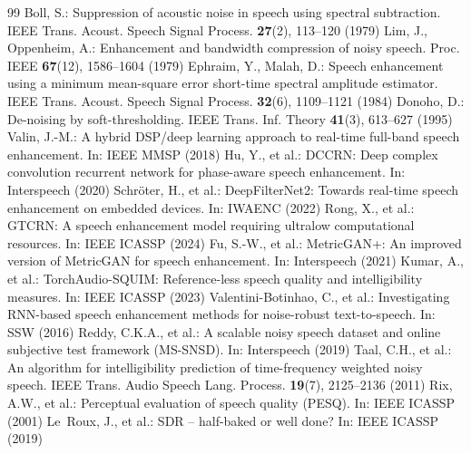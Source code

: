 \documentclass[runningheads]{llncs}
\begin{document}
\begin{thebibliography}{99}
 Boll, S.: Suppression of acoustic noise in speech using spectral
subtraction. IEEE Trans. Acoust. Speech Signal Process. \textbf{27}(2),
113--120 (1979)
 Lim, J., Oppenheim, A.: Enhancement and bandwidth compression of
noisy speech. Proc. IEEE \textbf{67}(12), 1586--1604 (1979)
 Ephraim, Y., Malah, D.: Speech enhancement using a
minimum mean-square error short-time spectral amplitude estimator. IEEE Trans.
Acoust. Speech Signal Process. \textbf{32}(6), 1109--1121 (1984)
 Donoho, D.: De-noising by soft-thresholding. IEEE Trans. Inf.
Theory \textbf{41}(3), 613--627 (1995)
 Valin, J.-M.: A hybrid DSP/deep learning approach to real-time
full-band speech enhancement. In: IEEE MMSP (2018)
 Hu, Y., et al.: DCCRN: Deep complex convolution recurrent
network for phase-aware speech enhancement. In: Interspeech (2020)
 Schr\"oter, H., et al.: DeepFilterNet2: Towards
real-time speech enhancement on embedded devices. In: IWAENC (2022)
 Rong, X., et al.: GTCRN: A speech enhancement model requiring
ultralow computational resources. In: IEEE ICASSP (2024)
 Fu, S.-W., et al.: MetricGAN+: An improved version of
MetricGAN for speech enhancement. In: Interspeech (2021)
 Kumar, A., et al.: TorchAudio-SQUIM: Reference-less speech
quality and intelligibility measures. In: IEEE ICASSP (2023)
 Valentini-Botinhao, C., et al.: Investigating RNN-based
speech enhancement methods for noise-robust text-to-speech. In: SSW (2016)
 Reddy, C.K.A., et al.: A scalable noisy speech dataset and
online subjective test framework (MS-SNSD). In: Interspeech (2019)
 Taal, C.H., et al.: An algorithm for intelligibility prediction
of time-frequency weighted noisy speech. IEEE Trans. Audio Speech Lang. Process.
\textbf{19}(7), 2125--2136 (2011)
 Rix, A.W., et al.: Perceptual evaluation of speech quality
(PESQ). In: IEEE ICASSP (2001)
 Le~Roux, J., et al.: SDR -- half-baked or well done?
In: IEEE ICASSP (2019)
\end{thebibliography}
\end{document}
